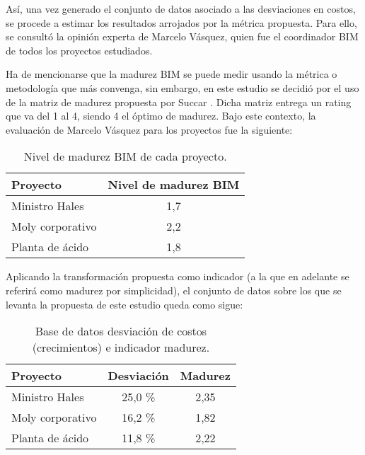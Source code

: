 Así, una vez generado el conjunto de datos asociado a las desviaciones en costos, se procede a estimar los resultados arrojados por la métrica propuesta. Para ello, se consultó la opinión experta de Marcelo Vásquez, quien fue el coordinador BIM de todos los proyectos estudiados. 

Ha de mencionarse que la madurez BIM se puede medir usando la métrica o metodología que más convenga, sin embargo, en este estudio se decidió por el uso de la matriz de madurez propuesta por Succar \cite{succar2010building}. Dicha matriz entrega un rating que va del 1 al 4, siendo 4 el óptimo de madurez. Bajo este contexto, la evaluación de Marcelo Vásquez para los proyectos fue la siguiente:

\begin{table}[H]
    \centering
    \label{tab.datos_mad_bim}
    \caption{Nivel de madurez BIM de cada proyecto.}
    \begin{tabular}{lc}
        \toprule 
        \textbf{Proyecto} & \textbf{Nivel de madurez BIM} \\
        \midrule
        Ministro Hales & 1,7 \\
        Moly corporativo & 2,2 \\
        Planta de ácido &  1,8 \\
        \bottomrule
    \end{tabular}
\end{table}

Aplicando la transformación propuesta como indicador (a la que en adelante se referirá como madurez por simplicidad), el conjunto de datos sobre los que se levanta la propuesta de este estudio queda como sigue:

\begin{table}[H]
    \centering
    \label{tab.datos_mad_bim_desv}
    \caption{Base de datos desviación de costos (crecimientos) e indicador madurez.}
    \begin{tabular}{lcc}
        \toprule 
        \textbf{Proyecto}  & \textbf{Desviación} & \textbf{Madurez} \\
        \midrule
        Ministro Hales     & 25,0 \%             & 2,35 \\
        Moly corporativo   & 16,2 \%             & 1,82 \\
        Planta de ácido    & 11,8 \%             & 2,22 \\
        \bottomrule
    \end{tabular}
\end{table}


